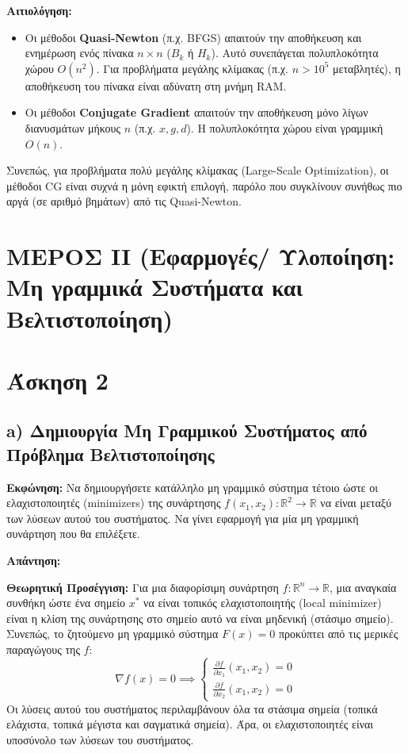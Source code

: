 \documentclass[a4paper,12pt]{article}
\begin{document}
\textbf{Αιτιολόγηση:}
\begin{itemize}
    \item Οι μέθοδοι \textbf{Quasi-Newton} (π.χ. BFGS) απαιτούν την αποθήκευση και ενημέρωση ενός πίνακα $n \times n$ ($B_k$ ή $H_k$). Αυτό συνεπάγεται πολυπλοκότητα χώρου $O(n^2)$. Για προβλήματα μεγάλης κλίμακας (π.χ. $n > 10^5$ μεταβλητές), η αποθήκευση του πίνακα είναι αδύνατη στη μνήμη RAM.
    \item Οι μέθοδοι \textbf{Conjugate Gradient} απαιτούν την αποθήκευση μόνο λίγων διανυσμάτων μήκους $n$ (π.χ. $x, g, d$). Η πολυπλοκότητα χώρου είναι γραμμική $O(n)$.
\end{itemize}
Συνεπώς, για προβλήματα πολύ μεγάλης κλίμακας (Large-Scale Optimization), οι μέθοδοι CG είναι συχνά η μόνη εφικτή επιλογή, παρόλο που συγκλίνουν συνήθως πιο αργά (σε αριθμό βημάτων) από τις Quasi-Newton.

\section*{ΜΕΡΟΣ II (Εφαρμογές/ Υλοποίηση: Μη γραμμικά Συστήματα και Βελτιστοποίηση)}

\section*{Άσκηση 2}

\subsection*{a) Δημιουργία Μη Γραμμικού Συστήματος από Πρόβλημα Βελτιστοποίησης}

\textbf{Εκφώνηση:}
Να δημιουργήσετε κατάλληλο μη γραμμικό σύστημα τέτοιο ώστε οι ελαχιστοποιητές (minimizers) της συνάρτησης $f(x_1,x_2): \mathbb{R}^2 \rightarrow \mathbb{R}$ να είναι μεταξύ των λύσεων αυτού του συστήματος. Να γίνει εφαρμογή για μία μη γραμμική συνάρτηση που θα επιλέξετε.

\textbf{Απάντηση:}

\textbf{Θεωρητική Προσέγγιση:}
Για μια διαφορίσιμη συνάρτηση $f: \mathbb{R}^n \rightarrow \mathbb{R}$, μια αναγκαία συνθήκη ώστε ένα σημείο $x^*$ να είναι τοπικός ελαχιστοποιητής (local minimizer) είναι η κλίση της συνάρτησης στο σημείο αυτό να είναι μηδενική (στάσιμο σημείο).
Συνεπώς, το ζητούμενο μη γραμμικό σύστημα $F(x) = 0$ προκύπτει από τις μερικές παραγώγους της $f$:
\begin{equation}
    \nabla f(x) = 0 \implies 
    \begin{cases}
        \frac{\partial f}{\partial x_1}(x_1, x_2) = 0 \\
        \frac{\partial f}{\partial x_2}(x_1, x_2) = 0
    \end{cases}
\end{equation}
Οι λύσεις αυτού του συστήματος περιλαμβάνουν όλα τα στάσιμα σημεία (τοπικά ελάχιστα, τοπικά μέγιστα και σαγματικά σημεία). Άρα, οι ελαχιστοποιητές είναι υποσύνολο των λύσεων του συστήματος.
\end{document}
